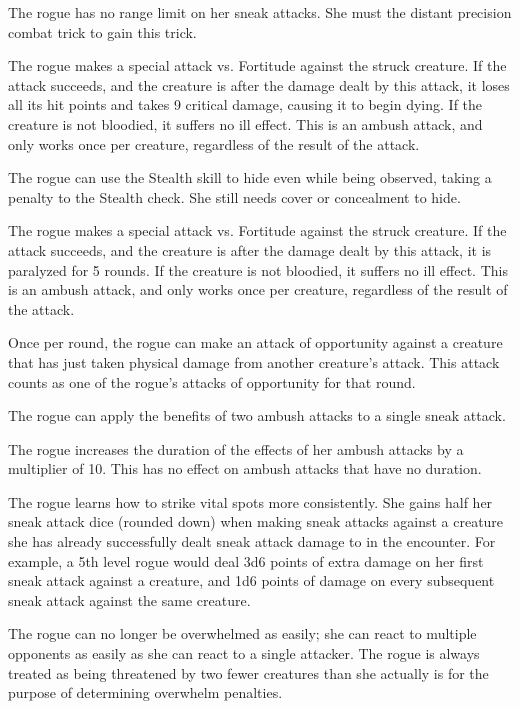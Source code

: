  The rogue has no range limit on her sneak attacks. She must the distant precision combat trick to gain this trick.

 The rogue makes a special attack vs. Fortitude against the struck creature. If the attack succeeds, and the creature is \bloodied after the damage dealt by this attack, it loses all its hit points and takes 9 critical damage, causing it to begin dying. If the creature is not bloodied, it suffers no ill effect. This is an ambush attack, and only works once per creature, regardless of the result of the attack.

 The rogue can use the Stealth skill to hide even while being observed, taking a  penalty to the Stealth check. She still needs cover or concealment to hide.

 The rogue makes a special attack vs. Fortitude against the struck creature. If the attack succeeds, and the creature is \bloodied after the damage dealt by this attack, it is paralyzed for 5 rounds. If the creature is not bloodied, it suffers no ill effect. This is an ambush attack, and only works once per creature, regardless of the result of the attack.

 Once per round, the rogue can make an attack of opportunity against a creature that has just taken physical damage from another creature's attack. This attack counts as one of the rogue's attacks of opportunity for that round.

 The rogue can apply the benefits of two ambush attacks to a single sneak attack.

 The rogue increases the duration of the effects of her ambush attacks by a multiplier of 10. This has no effect on ambush attacks that have no duration.

 The rogue learns how to strike vital spots more consistently. She gains half her sneak attack dice (rounded down) when making sneak attacks against a creature she has already successfully dealt sneak attack damage to in the encounter. For example, a 5th level rogue would deal 3d6 points of extra damage on her first sneak attack against a creature, and 1d6 points of damage on every subsequent sneak attack against the same creature.

 The rogue can no longer be overwhelmed as easily; she can react to multiple opponents as easily as she can react to a single attacker. The rogue is always treated as being threatened by two fewer creatures than she actually is for the purpose of determining overwhelm penalties. 

